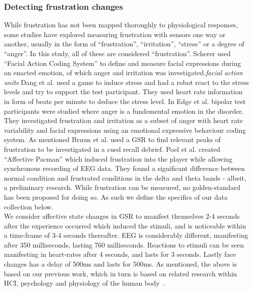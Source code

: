\subsubsection{Detecting frustration changes}
While frustration has not been mapped thoroughly to physiological responses, some studies have explored measuring frustration with sensors one way or another, usually in the form of ``frustration'', ``irritation'', ``stress'' or a degree of ``anger''. In this study, all of these are considered ``frustration''.
Scherer used ``Facial Action Coding System'' to define and measure facial expressions during an enacted emotion, of which anger and irritation was investigated.\textit{facial action units}
Dang et al.\cite{stress_robot} used a game to induce stress and had a robot react to the stress levels and try to support the test participant. 
They used heart rate information in form of beats per minute to deduce the stress level.
In Edge et al. \cite{bipolar_frustration} bipolar test participants were studied where anger is a fundemental emotion in the disorder. 
They investigated frustration and irritation as a subset of anger with heart rate variability and facial expressions using an emotional expressive behaviour coding system. 
As mentioned Bruun et al. \cite{LH-paper} used a GSR to find relevant peaks of frustration to be investigated in a cued recall debrief. 
Poel et al. \cite{affective_pacman} created ``Affective Pacman'' which induced frustration into the player while allowing synchronous recording of EEG data. They found a significant difference between normal condition and frustrated conditions in the delta and theta bands - albeit, a preliminary research.
While frustration can be measured, no golden-standard has been proposed for doing so. 
As such we define the specifics of our data collection below.\\

We consider affective state changes in GSR to manifest themselves 2-4 seconds after the experience occurred which
induced the stimuli, and is noticeable within a time-frame of 3-4 seconds thereafter. EEG is considerably different,
manifesting after 350 milliseconds, lasting 760 milliseconds. Reactions to stimuli can be seen manifesting in heart-rates
after 4 seconds, and lasts for 3 seconds. Lastly face changes has a delay of 500ms and lasts for 500ms. As mentioned,
the above is based on our previous work, which in turn is based on related research within HCI, psychology and
physiology of the human body~\cite{9th_semester_project}.

